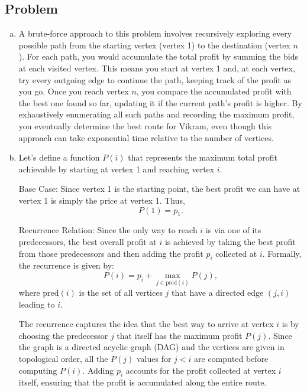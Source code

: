 \documentclass[12pt, letterpaper]{article}
\theoremstyle{definition}
\newcounter{problem}
\newcommand{\q}{
    \newpage %
    \stepcounter{problem} %
    \subsection*{Problem \arabic{problem}} %
}
\begin{document}
\q
\begin{enumerate}[(a)]
    \item A brute-force approach to this problem involves recursively exploring every possible path from the starting vertex (vertex 1) to the destination (vertex $n$). For each path, you would accumulate the total profit by summing the bids at each visited vertex. This means you start at vertex 1 and, at each vertex, try every outgoing edge to continue the path, keeping track of the profit as you go. Once you reach vertex $n$, you compare the accumulated profit with the best one found so far, updating it if the current path's profit is higher. By exhaustively enumerating all such paths and recording the maximum profit, you eventually determine the best route for Vikram, even though this approach can take exponential time relative to the number of 
    vertices.
    
    \item Let's define a function \(P(i)\) that represents the maximum total profit achievable by starting at vertex 1 and reaching vertex \(i\). 

    Base Case:  
    Since vertex 1 is the starting point, the best profit we can have at vertex 1 is simply the price at vertex 1. Thus,  
    \[
    P(1) = p_1.
    \]
    
    Recurrence Relation:
    Since the only way to reach \(i\) is via one of its predecessors, the best overall profit at \(i\) is achieved by taking the best profit from those predecessors and then adding the profit \(p_i\) collected at \(i\). Formally, the recurrence is given by:
    \[
    P(i) = p_i + \max_{j \in \text{pred}(i)} P(j),
    \]
    where \(\text{pred}(i)\) is the set of all vertices \(j\) that have a directed edge \((j, i)\) leading to \(i\).
    
    The recurrence captures the idea that the best way to arrive at vertex \(i\) is by choosing the predecessor \(j\) that itself has the maximum profit \(P(j)\).  
    Since the graph is a directed acyclic graph (DAG) and the vertices are given in topological order, all the \(P(j)\) values for \(j < i\) are computed before computing \(P(i)\).  
    Adding \(p_i\) accounts for the profit collected at vertex \(i\) itself, ensuring that the profit is accumulated along the entire route.


\end{enumerate}
\end{document}
